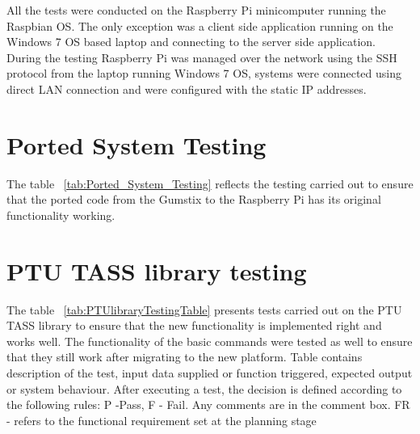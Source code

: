 All the tests were conducted on the Raspberry Pi minicomputer running the Raspbian OS. The only exception was a client side application running on the Windows 7 OS based laptop and connecting to the server side application. During the testing Raspberry Pi was managed over the network using the SSH protocol from the laptop running Windows 7 OS,  systems were connected using direct LAN connection and were configured with the static IP addresses.

\section{Ported System Testing}
The table ~\ref{tab:Ported_System_Testing} reflects the testing carried out to ensure that the ported code from the Gumstix to the Raspberry Pi has its original functionality working. 

\section{PTU TASS library testing} 
The table ~\ref{tab:PTUlibraryTestingTable} presents tests carried out on the PTU TASS library to ensure that the new functionality is implemented right and works well. The functionality of the basic commands were tested as well to ensure that they still work after migrating to the new platform. Table contains description of the test, input data supplied or function triggered, expected output or system behaviour. After executing a test, the decision is defined according to the following rules: P -Pass, F - Fail. Any comments are in the comment box. FR - refers to the functional requirement set at the planning stage

